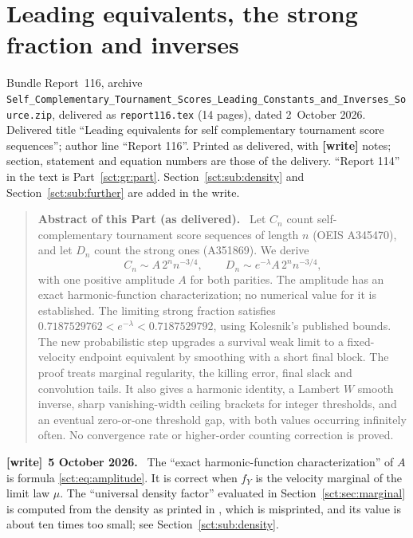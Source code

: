 \documentclass[11pt,letterpaper]{article}
\newcommand{\file}[1]{\nolinkurl{#1}}
\theoremstyle{definition}\newtheorem{remark}[theorem]{Remark}
\newcommand{\fY}{f_Y}\newcommand{\code}[1]{\texttt{#1}}
\newenvironment{writenote}[1][]{\par\smallskip\begingroup\small
 \noindent\textbf{[write]}\if\relax\detokenize{#1}\relax\else~\textbf{#1.}\fi\ }%
 {\par\endgroup\smallskip}
\newenvironment{partabstract}{\begin{quote}\small\noindent\textbf{Abstract of this Part (as delivered).}\ }{\end{quote}}
\newcommand{\partsource}[1]{\par\noindent\begin{minipage}{\textwidth}\small #1\end{minipage}\par\medskip}
\begin{document}
\part{Leading equivalents, the strong fraction and inverses}\label{sct:part}
\partsource{Bundle Report~116, archive \file{Self_Complementary_Tournament_Scores_Leading_Constants_and_Inverses_Source.zip}, delivered as \file{report116.tex} (14 pages), dated 2~October 2026. Delivered title ``Leading equivalents for self complementary tournament score sequences''; author line ``Report 116''. Printed as delivered, with \textbf{[write]} notes; section, statement and equation numbers are those of the delivery. ``Report 114'' in the text is Part~\ref{sct:gr:part}. Section~\ref{sct:sub:density} and Section~\ref{sct:sub:further} are added in the write.}
\begin{partabstract}
Let $C_n$ count self-complementary tournament score sequences of length $n$
(OEIS A345470), and let $D_n$ count the strong ones (A351869). We derive
\[
 C_n\sim A\,2^n n^{-3/4},\qquad
 D_n\sim e^{-\lambda}A\,2^n n^{-3/4},
\]
with one positive amplitude $A$ for both parities. The amplitude has an exact
harmonic-function characterization; no numerical value for it is established.
The limiting strong fraction satisfies
$0.7187529762<e^{-\lambda}<0.7187529792$, using Kolesnik's published bounds.
The new probabilistic step upgrades a survival weak limit to a fixed-velocity
endpoint equivalent by smoothing with a short final block. The proof treats
marginal regularity, the killing error, final slack and convolution tails.
It also gives a harmonic identity, a Lambert $W$ smooth inverse, sharp
vanishing-width ceiling brackets for integer thresholds, and an eventual
zero-or-one threshold gap, with both values occurring infinitely often.
No convergence rate or higher-order counting correction is proved.
\end{partabstract}
\begin{writenote}[5 October 2026]
The ``exact harmonic-function characterization'' of $A$ is formula \eqref{sct:eq:amplitude}. It is correct when $\fY$ is the velocity marginal of the limit law $\mu$. The ``universal density factor'' evaluated in Section~\ref{sct:sec:marginal} is computed from the density as printed in \cite{dw}, which is misprinted, and its value is about ten times too small; see Section~\ref{sct:sub:density}.
\end{writenote}
\end{document}
